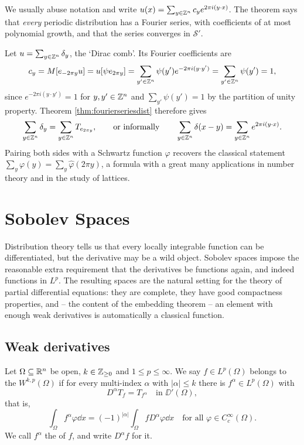 \documentclass[a4paper]{scrartcl}
\newcommand{\Sch}{\mathcal{S}}
\begin{document}
We usually abuse notation and write $u(x)=\sum_{y\in\mathbb{Z}^n}c_ye^{2\pi i(y\cdot x)}$. The theorem says that \emph{every} periodic distribution has a Fourier series, with coefficients of at most polynomial growth, and that the series converges in $\Sch'$.

\begin{example}
	Let $u=\sum_{y\in\mathbb{Z}^n}\delta_y$, the `Dirac comb'. Its Fourier coefficients are
	$$c_y=M[e_{-2\pi y}u]=u[\psi e_{2\pi y}]=\sum_{y'\in\mathbb{Z}^n}\psi(y')e^{-2\pi i(y\cdot y')}=\sum_{y'\in\mathbb{Z}^n}\psi(y')=1,$$
	since $e^{-2\pi i (y \cdot y')}=1$ for $y,y'\in\mathbb{Z}^n$ and $\sum_{y'}\psi(y')=1$ by the partition of unity property. Theorem \ref{thm:fourierseriesdist} therefore gives 
	$$\sum_{y\in\mathbb{Z}^n}\delta_y = \sum_{y\in\mathbb{Z}^n}T_{e_{2\pi y}}, \qquad \text{or informally} \qquad \sum_{y\in\mathbb{Z}^n}\delta(x-y)=\sum_{y\in\mathbb{Z}^n}e^{2\pi i (y\cdot x)}.$$
	Pairing both sides with a Schwartz function $\varphi$ recovers the classical statement $\sum_{y}\varphi(y)=\sum_y\hat\varphi(2\pi y)$, a formula with a great many applications in number theory and in the study of lattices.
\end{example}

\section{Sobolev Spaces}\label{sec:sobolev}

Distribution theory tells us that every locally integrable function can be differentiated, but the derivative may be a wild object. Sobolev spaces impose the reasonable extra requirement that the derivatives be functions again, and indeed functions in $L^p$. The resulting spaces are the natural setting for the theory of partial differential equations: they are complete, they have good compactness properties, and -- the content of the embedding theorem -- an element with enough weak derivatives is automatically a classical function.

\subsection{Weak derivatives}

\begin{definition}
	Let $\Omega\subseteq\mathbb{R}^n$ be open, $k\in\mathbb{Z}_{\ge0}$ and $1\le p\le\infty$. We say $f \in L^p(\Omega)$ belongs to the  $W^{k,p}(\Omega)$ if for every multi-index $\alpha$ with $|\alpha|\le k$ there is $f^\alpha\in L^p(\Omega)$ with
	$$D^\alpha T_f = T_{f^\alpha} \quad\text{in }\DD'(\Omega),$$
	that is,
	$$\int_\Omega f^\alpha\varphi\dd x = (-1)^{|\alpha|}\int_\Omega fD^\alpha\varphi\dd x \quad\text{for all }\varphi\in C_c^\infty(\Omega).$$
	We call $f^\alpha$ the  of $f$, and write $D^\alpha f$ for it.
\end{definition}
\end{document}
